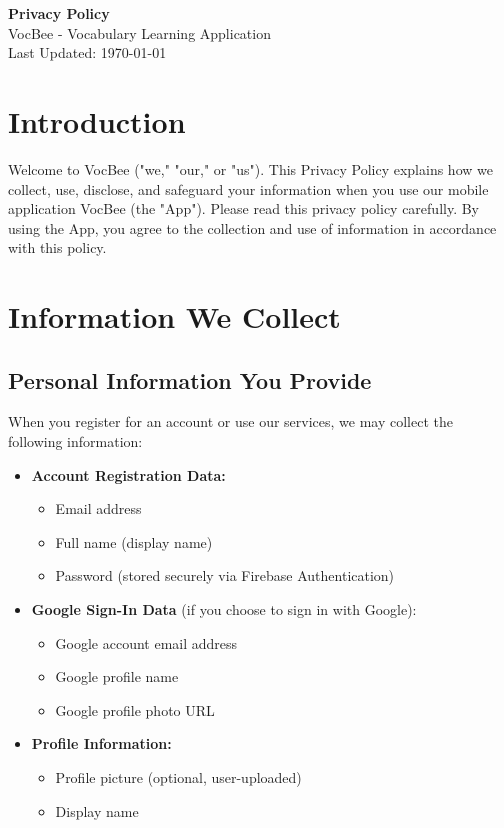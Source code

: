 \documentclass[11pt,a4paper]{article}
\begin{document}
\begin{center}
    \LARGE\textbf{Privacy Policy}\\[0.5em]
    \large VocBee - Vocabulary Learning Application\\[0.5em]
    \normalsize Last Updated: \today
\end{center}

\vspace{1em}

\section{Introduction}

Welcome to VocBee ("we," "our," or "us"). This Privacy Policy explains how we collect, use, disclose, and safeguard your information when you use our mobile application VocBee (the "App"). Please read this privacy policy carefully. By using the App, you agree to the collection and use of information in accordance with this policy.

\section{Information We Collect}

\subsection{Personal Information You Provide}

When you register for an account or use our services, we may collect the following information:

\begin{itemize}[leftmargin=2em]
    \item \textbf{Account Registration Data:}
    \begin{itemize}
        \item Email address
        \item Full name (display name)
        \item Password (stored securely via Firebase Authentication)
    \end{itemize}
    
    \item \textbf{Google Sign-In Data} (if you choose to sign in with Google):
    \begin{itemize}
        \item Google account email address
        \item Google profile name
        \item Google profile photo URL
    \end{itemize}
    
    \item \textbf{Profile Information:}
    \begin{itemize}
        \item Profile picture (optional, user-uploaded)
        \item Display name
    \end{itemize}
\end{itemize}
\end{document}
